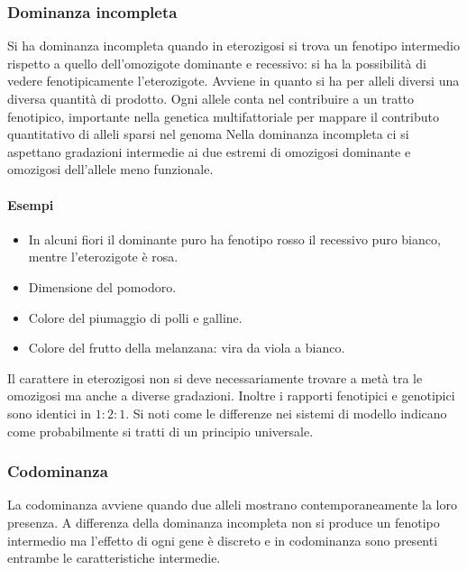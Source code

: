 \subsubsection{Dominanza incompleta}
Si ha dominanza incompleta quando in eterozigosi si trova un fenotipo intermedio rispetto a quello dell'omozigote dominante e recessivo: si ha la possibilit\`a di vedere fenotipicamente l'eterozigote.  
Avviene in quanto si ha per alleli diversi una diversa quantit\`a di prodotto. Ogni allele conta nel contribuire a un tratto fenotipico, importante nella genetica multifattoriale per mappare il contributo
quantitativo di alleli sparsi nel genoma  Nella dominanza incompleta ci si aspettano gradazioni intermedie ai due estremi di omozigosi dominante e omozigosi dell'allele meno funzionale. 
\paragraph{Esempi}
\begin{itemize}
	\item In alcuni fiori il dominante puro ha fenotipo rosso il recessivo puro bianco, mentre l'eterozigote \`e rosa.
	\item Dimensione del pomodoro.
	\item Colore del piumaggio di polli e galline.
	\item Colore del frutto della melanzana: vira da viola a bianco.
\end{itemize}
Il carattere in eterozigosi non si deve necessariamente trovare a met\`a tra le omozigosi ma anche a diverse gradazioni. Inoltre i rapporti fenotipici e genotipici sono identici in $1:2:1$. 
Si noti come le differenze nei sistemi di modello indicano come probabilmente si tratti di un principio universale. 
\subsubsection{Codominanza}
La codominanza avviene quando due alleli mostrano contemporaneamente la loro presenza. A differenza della dominanza incompleta non si produce un fenotipo intermedio ma l'effetto di 
ogni gene \`e discreto e in codominanza sono presenti entrambe le caratteristiche intermedie.
